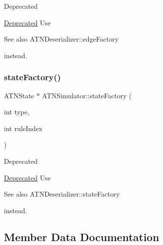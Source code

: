 \begin{DoxyRefDesc}{Deprecated}
\item[\hyperlink{deprecated__deprecated000004}{Deprecated}]Use \begin{DoxySeeAlso}{See also}
A\+T\+N\+Deserializer\+::edge\+Factory


\end{DoxySeeAlso}
instead. \end{DoxyRefDesc}
\mbox{\label{classantlr4_1_1atn_1_1ATNSimulator_a57878604b6496cc6aa80e29811e05660}} 
\subsubsection{\texorpdfstring{state\+Factory()}{stateFactory()}}
{\footnotesize\ttfamily A\+T\+N\+State $\ast$ A\+T\+N\+Simulator\+::state\+Factory (\begin{DoxyParamCaption}\item[{int}]{type,  }\item[{int}]{rule\+Index }\end{DoxyParamCaption})\hspace{0.3cm}{\ttfamily [static]}}

\begin{DoxyRefDesc}{Deprecated}
\item[\hyperlink{deprecated__deprecated000005}{Deprecated}]Use \begin{DoxySeeAlso}{See also}
A\+T\+N\+Deserializer\+::state\+Factory


\end{DoxySeeAlso}
instead. \end{DoxyRefDesc}


\subsection{Member Data Documentation}
\mbox{\label{classantlr4_1_1atn_1_1ATNSimulator_a73bf77d58d1457cc0543600da3201bea}} 
